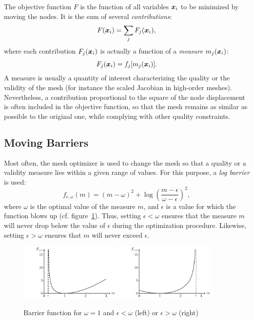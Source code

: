 \documentclass[12pt,a4paper,a4wide]{article}
\renewcommand{\vec}[1]{\ensuremath{\text{\boldmath $#1$\unboldmath}}}
\newcommand{\mvx}{\vec{x}}
\begin{document}
The objective function $F$ is the function of all variables $\mvx_i$
to be minimized by moving the nodes. It is the sum of several
\emph{contributions}:
\[
F(\mvx_i) = \sum_{j} F_j(\mvx_i),
\]
where each contribution $F_j(\mvx_i)$ is actually a function of
a \emph{measure} $m_j(\mvx_i)$:
\[
F_j(\mvx_i) = f_j[m_j(\mvx_i)].
\]
A measure is usually a quantity of interest
characterizing the quality or the validity of the mesh (for
instance the scaled Jacobian in high-order meshes). Nevertheless,
a contribution proportional to the square of the node displacement
is often included in the objective function, so that the mesh
remains as similar as possible to the original one, while complying
with other quality constraints.


\subsection{Moving Barriers}

Most often, the mesh optimizer is used to change the mesh so that a
quality or a validity measure lies within a given range of values.
For this purpose, a \emph{log barrier} is used:
\[
f_{\epsilon,\omega}(m) = (m - \omega)^2 +
\log\left(\frac{m-\epsilon}{\omega-\epsilon}\right)^2,
\]
where $\omega$ is the optimal value of the measure $m$, and $\epsilon$
is a value for which the function blows up (cf.
figure~\ref{fig:barrier}). Thus, setting $\epsilon<\omega$ ensures that
the measure $m$ will never drop below the value of $\epsilon$ during the
optimization procedure. Likewise, setting $\epsilon>\omega$ ensures that
$m$ will never exceed $\epsilon$.

\begin{figure}
\centering
\includegraphics[width=0.45\textwidth]{log_barrier/log_barrier}
\includegraphics[width=0.45\textwidth]{log_barrier/log_barrier_max}
\caption{Barrier function for $\omega=1$ and
$\epsilon<\omega$ (left) or $\epsilon>\omega$
(right)\label{fig:barrier}} 
\end{figure}
\end{document}
